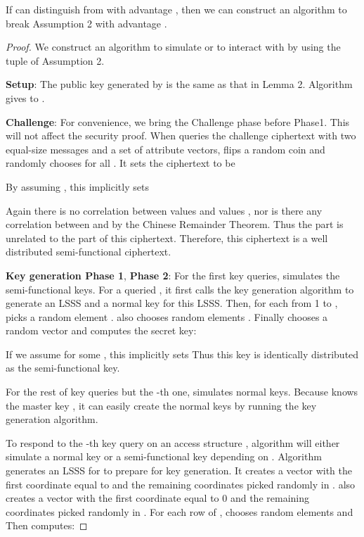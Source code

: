 \documentclass[twocolumn]{svjour3}          \smartqed  \usepackage{graphicx}
\begin{document}
\begin{lemma}\label{lem3} If   can distinguish  from  with advantage , then we can construct an algorithm
 to break Assumption 2 with advantage .
\end{lemma}

\begin{proof} We construct an algorithm  to simulate  or  to interact with  by using the tuple
 of Assumption 2.

\medskip
\noindent\textbf{Setup}: The public key  generated by  is the same as that in Lemma 2. Algorithm  gives  to
.

\medskip
\noindent\textbf{Challenge}: For convenience, we bring the Challenge phase before Phase1. This will not affect the security proof. When 
queries the challenge ciphertext with two equal-size messages  and a set  of attribute vectors,  flips a random coin
 and randomly chooses  for all . It sets the ciphertext to be
        
        
        
By assuming , this implicitly sets

Again there is no correlation between values  and values , nor is there any correlation between  and  by the Chinese Remainder Theorem. Thus the  part is unrelated to the  part of
this ciphertext. Therefore, this ciphertext is a well distributed semi-functional ciphertext.

\medskip
\noindent\textbf{Key generation Phase 1}, \textbf{Phase 2}: For the first  key queries,  simulates the semi-functional keys. For a
queried , it first calls the key generation algorithm to generate an LSSS  and a normal key  for this LSSS. Then, for each  from 1 to ,  picks a random element .  also chooses random elements
. Finally  chooses a random vector  and computes the
secret key:




If we assume  for some , this implicitly sets  Thus this key is identically
distributed as the semi-functional key.

For the rest of key queries but the -th one,  simulates normal keys. Because  knows the master key , it can easily
create the normal keys by running the key generation algorithm.

To respond to the -th key query on an access structure , algorithm  will either simulate a normal key or a semi-functional key
depending on . Algorithm  generates an LSSS for  to prepare for key generation. It creates a vector  with
the first coordinate equal to  and the remaining  coordinates picked randomly in .  also creates a vector
 with the first coordinate equal to 0 and the remaining  coordinates picked randomly in . For each row  of
,  chooses random elements
 and  
Then  computes:




\end{proof}
\end{document}
